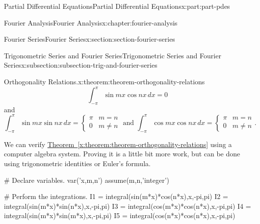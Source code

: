 \documentclass[twoside,10pt,]{book}
\newcommand{\xreffont}{\relax}
\numberwithin{equation}{part}
\newcommand{\amp}{&}
\begin{document}
\begin{partptx}{Partial Differential Equations}{}{Partial Differential Equations}{}{}{x:part:part-pdes}
\begin{chapterptx}{Fourier Analysis}{}{Fourier Analysis}{}{}{x:chapter:fourier-analysis}
\begin{sectionptx}{Fourier Series}{}{Fourier Series}{}{}{x:section:section-fourier-series}
\begin{subsectionptx}{Trigonometric Series and Fourier Series}{}{Trigonometric Series and Fourier Series}{}{}{x:subsection:subsection-trig-and-fourier-series}
\begin{theorem}{Orthogonality Relations.}{}{x:theorem:theorem-orthogonality-relations}
\begin{equation*}
\int_{-\pi}^{\pi}\sin mx\cos nx\,dx = 0
\end{equation*}
and%
\begin{equation*}
\int_{-\pi}^{\pi}\sin mx\sin nx\,dx = \begin{cases} \pi \amp m=n \\ 0 \amp m\neq n\end{cases}\text{ and }\int_{-\pi}^{\pi}\cos mx\cos nx\,dx = \begin{cases} \pi \amp m=n \\ 0 \amp m\neq n\end{cases}\text{.}
\end{equation*}
%
\end{theorem}
We can verify \hyperref[x:theorem:theorem-orthogonality-relations]{Theorem~{\xreffont\ref{x:theorem:theorem-orthogonality-relations}}} using a computer algebra system. Proving it is a little bit more work, but can be done using trigonometric identities or Euler's formula.%
\begin{sageinput}
# Declare variables.
var('x,m,n')
assume(m,n,'integer')

# Perform the integrations.
I1 = integral(sin(m*x)*cos(n*x),x,-pi,pi)
I2 = integral(sin(m*x)*sin(n*x),x,-pi,pi)
I3 = integral(cos(m*x)*cos(n*x),x,-pi,pi)
I4 = integral(sin(m*x)*sin(m*x),x,-pi,pi)
I5 = integral(cos(n*x)*cos(n*x),x,-pi,pi)


\end{sageinput}
\end{subsectionptx}
\end{sectionptx}
\end{chapterptx}
\end{partptx}
\end{document}
